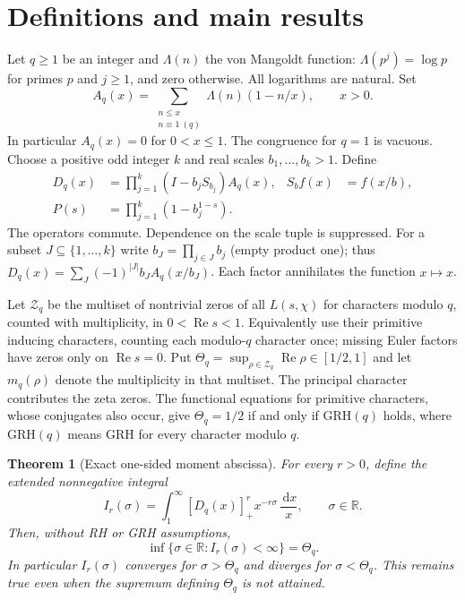 \documentclass[11pt]{article}
\newtheorem{theorem}{Theorem}[section]
\newcommand{\R}{\mathbb R}
\newcommand{\Rea}{\operatorname{Re}}
\newcommand{\pp}[1]{[#1]_+}
\newcommand{\dd}{\,\mathrm d}
\newcommand{\GRH}{\mathrm{GRH}}
\begin{document}
\section{Definitions and main results}
Let $q\ge 1$ be an integer and $\Lambda(n)$ the von Mangoldt function: $\Lambda(p^j)=\log p$ for primes $p$ and $j\ge1$, and zero otherwise. All logarithms are natural. Set
\begin{equation}\label{eq:A}
 A_q(x)=\sum_{\substack{n\le x\\n\equiv1\ (q)}}\Lambda(n)(1-n/x),\qquad x>0.
\end{equation}
In particular $A_q(x)=0$ for $0<x\le1$. The congruence for $q=1$ is vacuous. Choose a positive odd integer $k$ and real scales $b_1,\ldots,b_k>1$. Define
\begin{align}
 D_q(x)&=\prod_{j=1}^k(I-b_j S_{b_j})A_q(x),& S_b f(x)&=f(x/b),\label{eq:D}\\
 P(s)&=\prod_{j=1}^k(1-b_j^{1-s}).\label{eq:P}
\end{align}
The operators commute. Dependence on the scale tuple is suppressed. For a subset $J\subseteq\{1,\ldots,k\}$ write $b_J=\prod_{j\in J}b_j$ (empty product one); thus $D_q(x)=\sum_J(-1)^{|J|}b_J A_q(x/b_J)$. Each factor annihilates the function $x\mapsto x$.

Let $\mathcal Z_q$ be the multiset of nontrivial zeros of all $L(s,\chi)$ for characters modulo $q$, counted with multiplicity, in $0<\Rea s<1$. Equivalently use their primitive inducing characters, counting each modulo-$q$ character once; missing Euler factors have zeros only on $\Rea s=0$. Put $\Theta_q=\sup_{\rho\in\mathcal Z_q}\Rea\rho\in[1/2,1]$ and let $m_q(\rho)$ denote the multiplicity in that multiset. The principal character contributes the zeta zeros. The functional equations for primitive characters, whose conjugates also occur, give $\Theta_q=1/2$ if and only if $\GRH(q)$ holds, where $\GRH(q)$ means GRH for every character modulo $q$.

\begin{theorem}[Exact one-sided moment abscissa]\label{thm:main}
For every $r>0$, define the extended nonnegative integral
\[
 I_r(\sigma)=\int_1^\infty \pp{D_q(x)}^r x^{-r\sigma}\,\frac{\dd x}{x},\qquad \sigma\in\R.
\]
Then, without RH or GRH assumptions,
\begin{equation}\label{eq:absc}
 \inf\{\sigma\in\R:I_r(\sigma)<\infty\}=\Theta_q.
\end{equation}
In particular $I_r(\sigma)$ converges for $\sigma>\Theta_q$ and diverges for $\sigma<\Theta_q$. This remains true even when the supremum defining $\Theta_q$ is not attained.
\end{theorem}
\end{document}
